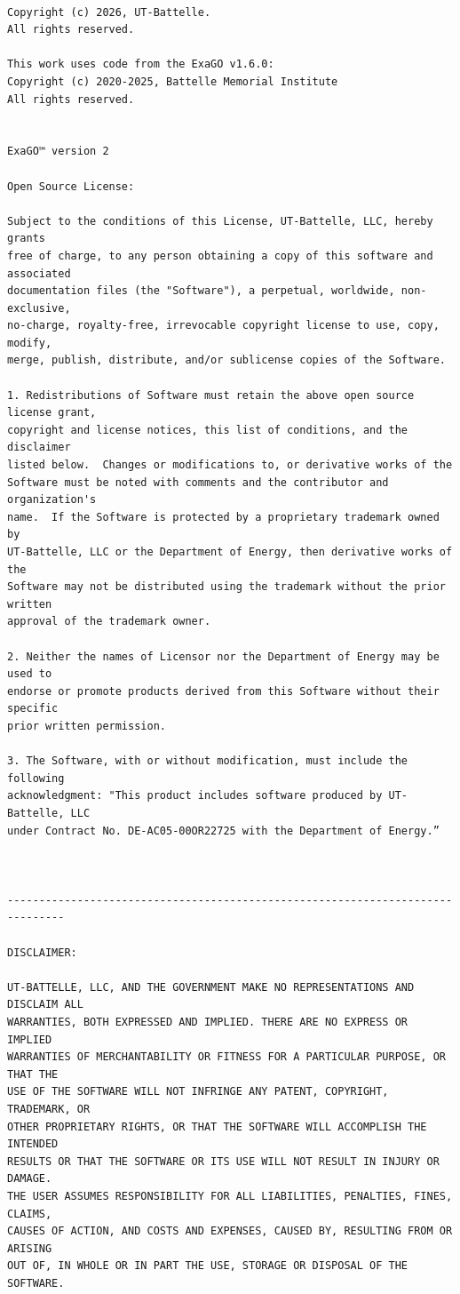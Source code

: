 \noindent

\small
\begin{verbatim}
    
Copyright (c) 2026, UT-Battelle.
All rights reserved.

This work uses code from the ExaGO v1.6.0:
Copyright (c) 2020-2025, Battelle Memorial Institute
All rights reserved.


ExaGO™ version 2

Open Source License:

Subject to the conditions of this License, UT-Battelle, LLC, hereby grants
free of charge, to any person obtaining a copy of this software and associated
documentation files (the "Software"), a perpetual, worldwide, non-exclusive,
no-charge, royalty-free, irrevocable copyright license to use, copy, modify,
merge, publish, distribute, and/or sublicense copies of the Software.

1. Redistributions of Software must retain the above open source license grant,
copyright and license notices, this list of conditions, and the disclaimer
listed below.  Changes or modifications to, or derivative works of the
Software must be noted with comments and the contributor and organization's
name.  If the Software is protected by a proprietary trademark owned by
UT-Battelle, LLC or the Department of Energy, then derivative works of the
Software may not be distributed using the trademark without the prior written
approval of the trademark owner.

2. Neither the names of Licensor nor the Department of Energy may be used to
endorse or promote products derived from this Software without their specific
prior written permission.
 
3. The Software, with or without modification, must include the following
acknowledgment: "This product includes software produced by UT-Battelle, LLC
under Contract No. DE-AC05-00OR22725 with the Department of Energy.”
 


-------------------------------------------------------------------------------

DISCLAIMER:

UT-BATTELLE, LLC, AND THE GOVERNMENT MAKE NO REPRESENTATIONS AND DISCLAIM ALL
WARRANTIES, BOTH EXPRESSED AND IMPLIED. THERE ARE NO EXPRESS OR IMPLIED
WARRANTIES OF MERCHANTABILITY OR FITNESS FOR A PARTICULAR PURPOSE, OR THAT THE
USE OF THE SOFTWARE WILL NOT INFRINGE ANY PATENT, COPYRIGHT, TRADEMARK, OR
OTHER PROPRIETARY RIGHTS, OR THAT THE SOFTWARE WILL ACCOMPLISH THE INTENDED
RESULTS OR THAT THE SOFTWARE OR ITS USE WILL NOT RESULT IN INJURY OR DAMAGE.
THE USER ASSUMES RESPONSIBILITY FOR ALL LIABILITIES, PENALTIES, FINES, CLAIMS,
CAUSES OF ACTION, AND COSTS AND EXPENSES, CAUSED BY, RESULTING FROM OR ARISING
OUT OF, IN WHOLE OR IN PART THE USE, STORAGE OR DISPOSAL OF THE SOFTWARE.
\end{verbatim}
